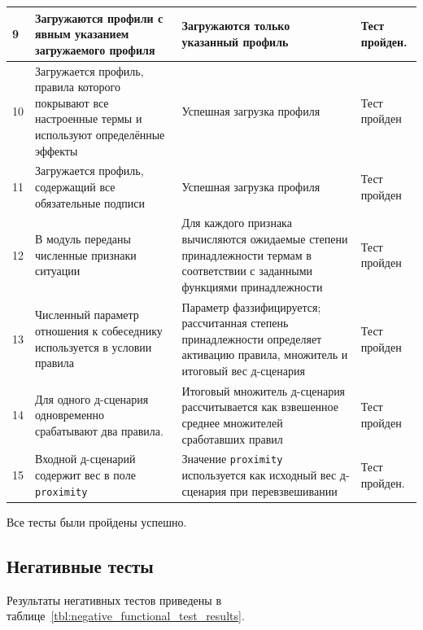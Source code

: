\begin{longtable}{|p{}|p{}|p{}|p{}|}
	\hline
	9 & Загружаются профили с явным указанием загружаемого профиля & Загружаются только указанный профиль & Тест пройден. \\
	\hline
	10 & Загружается профиль, правила которого покрывают
	все настроенные термы и используют определённые эффекты & Успешная загрузка профиля & Тест пройден \\
	\hline
	11 & Загружается профиль, содержащий все обязательные
	подписи & Успешная загрузка профиля & Тест пройден \\
	\hline
	12 & В модуль переданы численные признаки ситуации & Для каждого
	признака вычисляются ожидаемые степени принадлежности термам в
	соответствии с заданными функциями принадлежности & Тест пройден \\
	\hline
	13 & Численный параметр отношения к собеседнику используется в
	условии правила & Параметр фаззифицируется; рассчитанная степень
	принадлежности определяет активацию правила, множитель и итоговый вес
	д-сценария & Тест пройден \\
	\hline
	14 & Для одного д-сценария одновременно срабатывают два правила. &
	Итоговый множитель д-сценария рассчитывается как взвешенное среднее
	множителей сработавших правил & Тест пройден \\
	\hline
	15 & Входной д-сценарий содержит вес в поле \texttt{proximity} &
	Значение \texttt{proximity} используется как исходный вес
	д-сценария при перевзвешивании & Тест пройден. \\
	\hline
\end{longtable}

Все тесты были пройдены успешно.

\subsection*{Негативные тесты}

Результаты негативных тестов приведены в таблице~\ref{tbl:negative_functional_test_results}.

